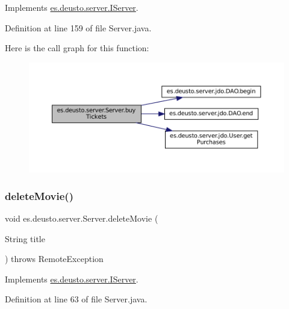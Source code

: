 Implements \mbox{\hyperlink{interfacees_1_1deusto_1_1server_1_1_i_server_ac3302c01fefc37a32c0bcbf79fcce44b}{es.\+deusto.\+server.\+I\+Server}}.



Definition at line 159 of file Server.\+java.

Here is the call graph for this function\+:
\nopagebreak
\begin{figure}[H]
\begin{center}
\leavevmode
\includegraphics[width=350pt]{classes_1_1deusto_1_1server_1_1_server_a3bbf9f19774d2fae5c831cfac1f2306c_cgraph}
\end{center}
\end{figure}
\mbox{\label{classes_1_1deusto_1_1server_1_1_server_a6501e4103fcc2ef691c15e4e02f7136c}} 
\subsubsection{\texorpdfstring{deleteMovie()}{deleteMovie()}\hspace{0.1cm}{\footnotesize\ttfamily [1/2]}}
{\footnotesize\ttfamily void es.\+deusto.\+server.\+Server.\+delete\+Movie (\begin{DoxyParamCaption}\item[{String}]{title }\end{DoxyParamCaption}) throws Remote\+Exception}



Implements \mbox{\hyperlink{interfacees_1_1deusto_1_1server_1_1_i_server_a0b3243dc04d49f7659fefec4e4fb43b7}{es.\+deusto.\+server.\+I\+Server}}.



Definition at line 63 of file Server.\+java.

